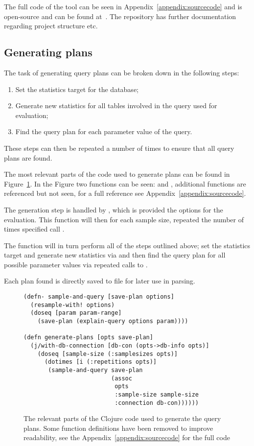 The full code of the tool can be seen in Appendix~\ref{appendix:sourcecode} and is
open-source and can be found at~\cite{barksten_mbark_m}. The repository has
further documentation regarding project structure etc.

\subsection{Generating plans}\label{sec:generatingplans}
The task of generating query plans can be broken down in the following steps:
\begin{enumerate}
\item Set the statistics target for the database;
\item Generate new statistics for all tables involved in the query used for evaluation;
\item Find the query plan for each parameter value of the query.
\end{enumerate}
These steps can then be repeated a number of times to ensure that all query plans are
found.

The most relevant parts of the code used to generate plans can be found in
Figure~\ref{fig:clj:generating}. In the Figure two functions can be seen:
 and , additional functions are
referenced but not seen, for a full reference see Appendix~\ref{appendix:sourcecode}.

The generation step is handled by , which is provided the
options for the evaluation. This function will then for each sample size,
repeated the number of times specified call .

The  function will in turn perform all of the steps
outlined above; set the statistics target and generate new statistics via
 and then find the query plan for all possible parameter
values via repeated calls to .

Each plan found is directly saved to file for later use in parsing.

\begin{figure}[ht]
  \begin{verbatim}
(defn- sample-and-query [save-plan options]
  (resample-with! options)
  (doseq [param param-range]
    (save-plan (explain-query options param))))

(defn generate-plans [opts save-plan]
  (j/with-db-connection [db-con (opts->db-info opts)]
    (doseq [sample-size (:samplesizes opts)]
      (dotimes [i (:repetitions opts)]
       (sample-and-query save-plan
                         (assoc
                          opts
                          :sample-size sample-size
                          :connection db-con))))))
   \end{verbatim}
   \caption[The clojure code to generate a query]{The relevant parts of the
     Clojure code used to generate the query plans. Some function definitions
     have been removed to improve readability, see the
     Appendix~\ref{appendix:sourcecode} for the full code}
\label{fig:clj:generating}
\end{figure}

